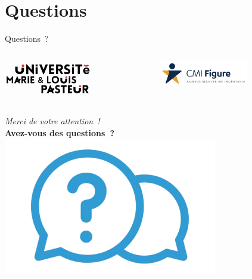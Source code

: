 \section*{Questions}
\begin{frame}{Questions~?}
	\vspace*{-0.3cm}
	\begin{columns}
		\begin{center}
			\includegraphics[width=0.6\textwidth]{images/logo_univ.png}
		\end{center}
		
		\begin{center}
			\includegraphics[width=0.6\textwidth]{images/logo_CMI.png}
		\end{center}
		
	\end{columns}
	\vspace*{0.2cm}
	
	\centering
	\emph{Merci de votre attention~!}\\
	\vspace{0.6cm}
	\textbf{Avez-vous des questions~?}
	\includegraphics[width=0.7\textwidth]{images/questions.png}
\end{frame}

